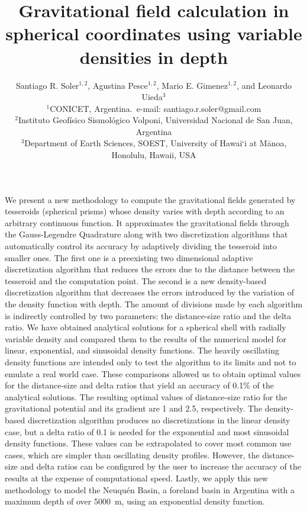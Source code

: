 \documentclass[extra, referee]{gji}
\begin{document}
\title[Variable Density Tesseroids]{
    Gravitational field calculation in spherical coordinates using variable
    densities in depth
}
\author[S.R. Soler, A. Pesce, M.E. Gimenez, and L. Uieda]{
    Santiago R. Soler$^{1,2}$, Agustina Pesce$^{1,2}$,
    Mario E. Gimenez$^{1,2}$, and Leonardo Uieda$^3$ \\
    $^1$CONICET, Argentina.~e-mail: santiago.r.soler@gmail.com\\
    $^2$Instituto Geofísico Sismológico Volponi, Universidad Nacional de
    San Juan, Argentina\\
    $^3$Department of Earth Sciences, SOEST, University of Hawai‘i at
    M\={a}noa, Honolulu, Hawaii, USA
}


\maketitle

\begin{summary}
We present a new methodology to compute the gravitational fields generated by
tesseroids (spherical prisms) whose density varies with depth according to
an arbitrary continuous function.
It approximates the gravitational fields through the Gauss-Legendre Quadrature along
with two discretization algorithms that automatically control its accuracy by adaptively
dividing the tesseroid into smaller ones.
The first one is a preexisting two dimensional adaptive discretization algorithm that
reduces the errors due to the distance between the tesseroid and the computation point.
The second is a new density-based discretization algorithm that
decreases the errors introduced by the variation of the density function with depth.
The amount of divisions made by each algorithm is indirectly controlled
by two parameters: the distance-size ratio and the delta ratio.
We have obtained analytical solutions for a spherical shell with radially variable
density and compared them to the results of the numerical model for linear,
exponential, and sinusoidal density functions.
The heavily oscillating density functions are intended only to test the algorithm to its
limits and not to emulate a real world case.
These comparisons allowed us to obtain optimal values for the distance-size and
delta ratios that yield an accuracy of 0.1\% of the analytical solutions.
The resulting optimal values of distance-size ratio for the gravitational potential and
its gradient are 1 and 2.5, respectively.
The density-based discretization algorithm produces no discretizations in the linear
density case, but a delta ratio of 0.1 is needed for the exponential and most sinusoidal
density functions.
These values can be extrapolated to cover most common use cases, which are simpler than
oscillating density profiles.
However, the distance-size and delta ratios can be configured by the user to increase
the accuracy of the results at the expense of computational speed.
Lastly, we apply this new methodology to model the Neuqu\'en Basin, a foreland basin in
Argentina with a maximum depth of over 5000~m, using an exponential density function.
\end{summary}
\end{document}
